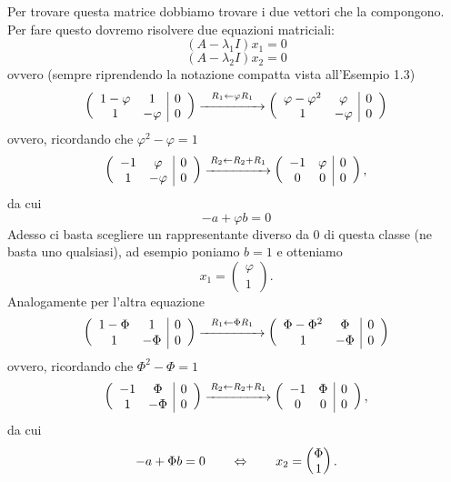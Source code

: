 \documentclass{article}     %
\begin{document}
Per trovare questa matrice dobbiamo trovare i due vettori che la compongono. Per fare questo dovremo risolvere due equazioni matriciali:
\[(A -\lambda_1 I)x_1 = 0\]
\[(A -\lambda_2 I)x_2 = 0\]
ovvero (sempre riprendendo la notazione compatta vista all'Esempio 1.3)
\[
    \left(\begin{array}{cc|c} 1 -\varphi&1&0\\1& -\varphi &0 \end{array}\right) 
    \overset{R_1\leftarrow \varphi R_1}{\xrightarrow{\hspace{1.6cm}}}
    \left(\begin{array}{cc|c} \varphi -\varphi^2&\varphi&0\\1& -\varphi &0 \end{array}\right) 
\]
ovvero, ricordando che $\varphi^2-\varphi=1$
\[
    \left(\begin{array}{cc|c} - 1&\varphi&0\\1& -\varphi &0 \end{array}\right) 
    \overset{R_2\leftarrow R_2 + R_1}{\xrightarrow{\hspace{1.6cm}}}
    \left(\begin{array}{cc|c} - 1&\varphi&0\\0& 0 &0 \end{array}\right) ,
\]
da cui
\[ - a +\varphi b = 0\]
Adesso ci basta scegliere un rappresentante diverso da 0 di questa classe (ne basta uno qualsiasi), ad esempio poniamo $b=1$ e otteniamo
\[x_1 =\begin{pmatrix} \varphi\\1 \end{pmatrix} .\]
Analogamente per l'altra equazione
\[
    \left(\begin{array}{cc|c} 1 -\Phi&1&0\\1& -\Phi &0 \end{array}\right) 
    \overset{R_1\leftarrow \Phi R_1}{\xrightarrow{\hspace{1.6cm}}}
    \left(\begin{array}{cc|c} \Phi -\Phi^2&\Phi&0\\1& -\Phi &0 \end{array}\right) 
\]
ovvero, ricordando che $\Phi^2-\Phi=1$
\[
    \left(\begin{array}{cc|c} - 1&\Phi&0\\1& -\Phi &0 \end{array}\right) 
    \overset{R_2\leftarrow R_2 + R_1}{\xrightarrow{\hspace{1.6cm}}}
    \left(\begin{array}{cc|c} - 1&\Phi&0\\0& 0 &0 \end{array}\right) ,
\]
da cui
\[ - a +\Phi b = 0\qquad \Leftrightarrow\qquad x_2 = \begin{pmatrix} \Phi\\1 \end{pmatrix} .\]
\end{document}
